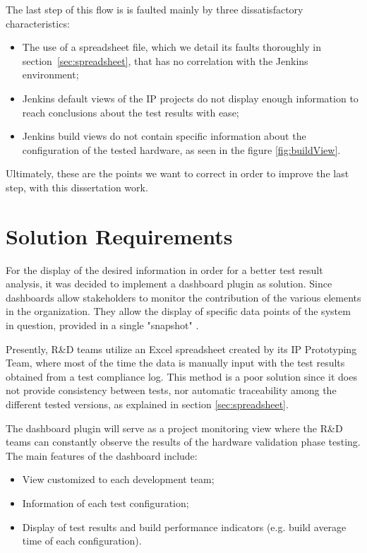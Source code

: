 The last step of this flow is is faulted mainly by three dissatisfactory characteristics:

\begin{itemize}

\item The use of a spreadsheet file, which we detail its faults thoroughly in section~\ref{sec:spreadsheet}, that has no correlation with the Jenkins environment;

\item Jenkins default views of the IP projects do not display enough information to reach conclusions about the test results with ease;

\item Jenkins build views do not contain specific information about the configuration of the tested hardware, as seen in the figure \ref{fig:buildView}.

\end{itemize}

Ultimately, these are the points we want to correct in order to improve the last step, with this dissertation work.

\section{Solution Requirements}\label{sc:requirements}

For the display of the desired information in order for a better test result analysis, it was decided to implement a dashboard plugin as solution. Since dashboards allow stakeholders to monitor the contribution of the various elements in the organization. They allow the display of specific data points of the system in question, provided in a single "snapshot" \cite{dashboard}.

Presently, R\&D teams utilize an Excel spreadsheet created by its IP Prototyping Team, where most of the time the data is manually input with the test results obtained from a test compliance log. This method is a poor solution since it does not provide consistency between tests, nor automatic traceability among the different tested versions, as explained in section \ref{sec:spreadsheet}.

The dashboard plugin will serve as a project monitoring view where the R\&D teams can constantly observe the results of the hardware validation phase testing. The main features of the dashboard include:

\begin{itemize}
\item View customized to each development team;
\item Information of each test configuration;
\item Display of test results and build performance indicators (e.g. build average time of each configuration).
\end{itemize}

